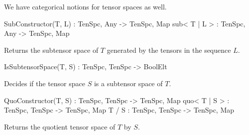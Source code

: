 We have categorical notions for tensor spaces as well.

\begin{intrinsics}
SubConstructor(T, L) : TenSpc, Any -> TenSpc, Map
sub< T | L > : TenSpc, Any -> TenSpc, Map
\end{intrinsics}

Returns the subtensor space of $T$ generated by the tensors in the sequence $L$.





\begin{intrinsics}
IsSubtensorSpace(T, S) : TenSpc, TenSpc -> BoolElt
\end{intrinsics}

Decides if the tensor space $S$ is a subtensor space of $T$.

\begin{intrinsics}
QuoConstructor(T, S) : TenSpc, TenSpc -> TenSpc, Map
quo< T | S > : TenSpc, TenSpc -> TenSpc, Map
T / S : TenSpc, TenSpc -> TenSpc, Map
\end{intrinsics}

Returns the quotient tensor space of $T$ by $S$.

